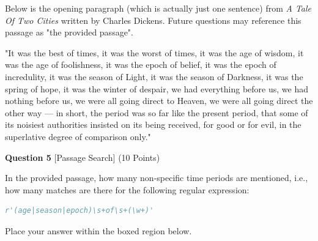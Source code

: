 \documentclass{report}
\begin{document}
\vspace{1.0cm}




\begin{minipage}{\textwidth}
    \noindent
    \vspace{0.25cm}

    \noindent
    Below is the opening paragraph (which is actually just one sentence) from
\textit{A Tale Of Two Cities} written by Charles Dickens.
Future questions may reference this passage as "the provided passage".

"It was the best of times, it was the worst of times, it was the age of wisdom, it was the age of foolishness,
it was the epoch of belief, it was the epoch of incredulity, it was the season of Light,
it was the season of Darkness, it was the spring of hope, it was the winter of despair, we had everything before us,
we had nothing before us, we were all going direct to Heaven, we were all going direct the other way
— in short, the period was so far like the present period, that some of its noisiest authorities insisted on its being received,
for good or for evil, in the superlative degree of comparison only."

    \vspace{0.25cm}


\end{minipage}





\vspace{1.0cm}




\begin{minipage}{\textwidth}
    \noindent
        \textbf{Question 5} [Passage Search] (10 Points)
    \vspace{0.25cm}

    \noindent
    In the provided passage, how many non-specific time periods are mentioned,
i.e., how many matches are there for the following regular expression:

\begin{lstlisting}[language=python]
r'(age|season|epoch)\s+of\s+(\w+)'
\end{lstlisting}

    \vspace{0.25cm}

    Place your answer within the boxed region below.

        \vspace{0.25cm}


        \begin{center}


        \end{center}
\end{minipage}
\end{document}
